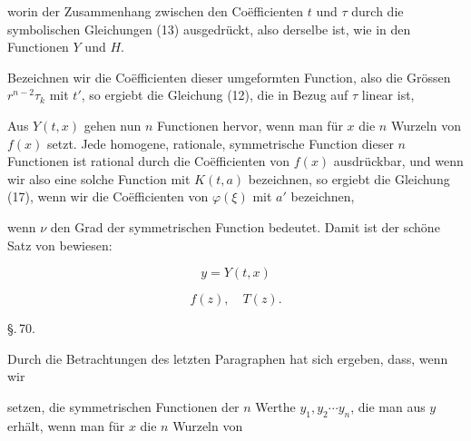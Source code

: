

worin der Zusammenhang zwischen den Co\"efficienten $t$ und $\tau$
durch die symbolischen Gleichungen (13) ausgedr\"uckt, also derselbe
 ist, wie in den Functionen $Y$ und $H$.


Bezeichnen wir die Co\"efficienten dieser umgeformten Function,
also die Gr\"ossen $r^{n-2}\tau_k$ mit $t'$, so ergiebt die Gleichung (12),
die in Bezug auf $\tau$ linear ist,


Aus $Y(t, x)$ gehen nun $n$ Functionen hervor, wenn man
f\"ur $x$ die $n$ Wurzeln von $f(x)$ setzt. Jede homogene, rationale,
symmetrische Function dieser $n$ Functionen ist rational durch
die Co\"efficienten von $f(x)$ ausdr\"uckbar, und wenn wir also eine
solche Function mit $K(t, a)$ bezeichnen, so ergiebt die Gleichung
(17), wenn wir die Co\"efficienten von $\varphi(\xi)$ mit $a'$ bezeichnen,


wenn $\nu$ den Grad der symmetrischen Function bedeutet. Damit
ist der sch\"one Satz von  bewiesen:


\[
y = Y(t, x)
\]


\[
f(z), \quad T(z).
\]

\begin{center}
\S.\,70.\\[2pt]
\end{center}

Durch die Betrachtungen des letzten Paragraphen hat sich
ergeben, dass, wenn wir


setzen, die symmetrischen Functionen der $n$ Werthe $y_1, y_2 \cdots y_n$,
die man aus $y$ erh\"alt, wenn man f\"ur $x$ die $n$ Wurzeln von
